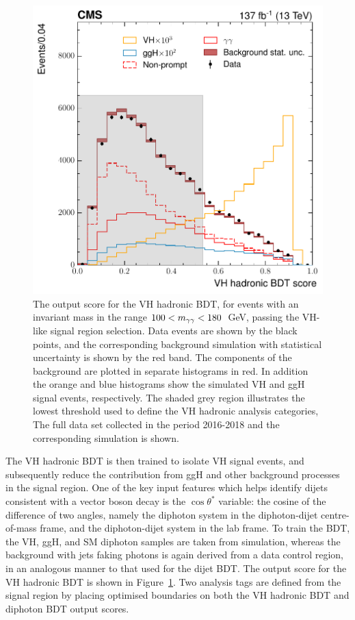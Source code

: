 \begin{figure}[htb!]
  \centering
  \includegraphics[width=.5\textwidth]{Figures/hgg_overview/VHhadBDT_DD_VH_had_mvascore_no_stack.pdf}
  \caption[VH hadronic BDT output score]
  {
    The output score for the VH hadronic BDT, for events with an invariant mass in the range $100<m_{\gamma\gamma}<180$~GeV, passing the VH-like signal region selection. Data events are shown by the black points, and the corresponding background simulation with statistical uncertainty is shown by the red band. The components of the background are plotted in separate histograms in red. In addition the orange and blue histograms show the simulated VH and ggH signal events, respectively. The shaded grey region illustrates the lowest threshold used to define the VH hadronic analysis categories, The full data set collected in the period 2016-2018 and the corresponding simulation is shown.
  }
  \label{fig:categorisation_vhhad}
\end{figure}

The VH hadronic BDT is then trained to isolate VH signal events, and subsequently reduce the contribution from ggH and other background processes in the signal region. One of the key input features which helps identify dijets consistent with a vector boson decay is the $\cos{\theta^*}$ variable: the cosine of the difference of two angles, namely the diphoton system in the diphoton-dijet centre-of-mass frame, and the diphoton-dijet system in the lab frame. To train the BDT, the VH, ggH, and SM diphoton samples are taken from simulation, whereas the background with jets faking photons is again derived from a data control region, in an analogous manner to that used for the dijet BDT. The output score for the VH hadronic BDT is shown in Figure~\ref{fig:categorisation_vhhad}. Two analysis tags are defined from the signal region by placing optimised boundaries on both the VH hadronic BDT and diphoton BDT output scores. 


